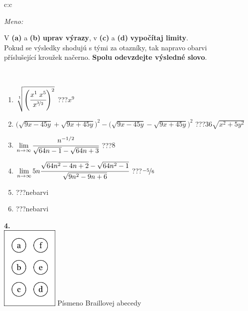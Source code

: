 \documentclass[10pt]{report}
\begin{document}
\begin{tabular}{c:c}
\begin{minipage}[c][104.5mm][t]{0.5\linewidth}
\begin{center}
\textit{Meno:}\phantom{xxxxxxxxxxxxxxxxxxxxxxxxxxxxxxxxxxxxxxxxxxxxxxxxxxxxxxxxxxxxxxxxx}\\[5mm]
\begin{minipage}{0.95\linewidth}
\begin{center}
V \textbf{(a)} a \textbf{(b)} \textbf{uprav výrazy}, v \textbf{(c)} a \textbf{(d)} \textbf{vypočítaj limity}.\\Pokud se výsledky shodujú s tými za otazníky, tak napravo obarvi\\příslušející kroužek načerno. \textbf{Spolu odevzdejte výsledné slovo}.
\end{center}
\end{minipage}
\\[1mm]
\begin{minipage}{0.79\linewidth}
\begin{center}
\begin{varwidth}{\linewidth}
\begin{enumerate}
\small
\item $\sqrt[1]{\left(\cfrac{x^{1}\;x^{5}}{x^{\nicefrac{3}{2}}}\right)^{2}}$\quad \dotfill\; ???\;\dotfill \quad $x^{9}$
\item {\footnotesize{\scriptsize$\big(\sqrt{9x-45y}+\sqrt{9x+45y}\big)^2-\big(\sqrt{9x-45y}-\sqrt{9x+45y}\big)^2$}\quad \dotfill\; ???\;\dotfill \quad $36\sqrt{x^2+5y^2}$}
\item $\lim\limits_{n\to\infty}\cfrac{n^{-1/2}}{\sqrt{64n-1}-\sqrt{64n+3}}$\quad \dotfill\; ???\;\dotfill \quad $8$
\item $\lim\limits_{n\to\infty}5n\cfrac{\sqrt{64n^2-4n+2}-\sqrt{64n^2-1}}{\sqrt{9n^2-9n+6}}$\quad \dotfill\; ???\;\dotfill \quad $\nicefrac{-5}{6}$
\item \quad \dotfill\; ???\;\dotfill \quad nebarvi
\item \quad \dotfill\; ???\;\dotfill \quad nebarvi
\end{enumerate}
\end{varwidth}
\end{center}
\end{minipage}
\begin{minipage}{0.20\linewidth}
\begin{center}
{\Huge\bfseries 4.} \\[2mm]
\includegraphics[height=40mm]{../images/braille.png}
{\small Písmeno Braillovej abecedy}
\end{center}
\end{minipage}
\end{center}
\end{minipage}
%
\end{tabular}
\end{document}
